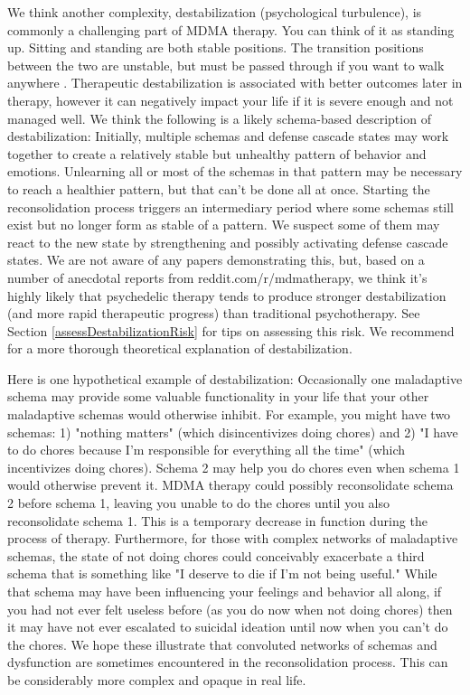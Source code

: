 \documentclass[12pt,letterpaper]{book}
\begin{document}
\label{def:destabilization}
We think another complexity, destabilization (psychological turbulence), is commonly a challenging part of MDMA therapy. You can think of it as standing up. Sitting and standing are both stable positions. The transition positions between the two are unstable, but must be passed through if you want to walk anywhere \cite{olthofDestabilization}. Therapeutic destabilization is associated with better outcomes later in therapy, however it can negatively impact your life if it is severe enough and not managed well. We think the following is a likely schema-based description of destabilization: Initially, multiple schemas and defense cascade states may work together to create a relatively stable but unhealthy pattern of behavior and emotions. Unlearning all or most of the schemas in that pattern may be necessary to reach a healthier pattern, but that can't be done all at once. Starting the reconsolidation process triggers an intermediary period where some schemas still exist but no longer form as stable of a pattern. We suspect some of them may react to the new state by strengthening and possibly activating defense cascade states. We are not aware of any papers demonstrating this, but, based on a number of anecdotal reports from reddit.com/r/mdmatherapy, we think it's highly likely that psychedelic therapy tends to produce stronger destabilization (and more rapid therapeutic progress) than traditional psychotherapy. See Section \ref{assessDestabilizationRisk} for tips on assessing this risk. We recommend \textcite{hayes2020complex} for a more thorough theoretical explanation of destabilization.

Here is one hypothetical example of destabilization: Occasionally one maladaptive schema may provide some valuable functionality in your life that your other maladaptive schemas would otherwise inhibit. For example, you might have two schemas: 1) "nothing matters" (which disincentivizes doing chores) and 2) "I have to do chores because I'm responsible for everything all the time" (which incentivizes doing chores). Schema 2 may help you do chores even when schema 1 would otherwise prevent it. MDMA therapy could possibly reconsolidate schema 2 before schema 1, leaving you unable to do the chores until you also reconsolidate schema 1. This is a temporary decrease in function during the process of therapy. Furthermore, for those with complex networks of maladaptive schemas, the state of not doing chores could conceivably exacerbate a third schema that is something like "I deserve to die if I'm not being useful." While that schema may have been influencing your feelings and behavior all along, if you had not ever felt useless before (as you do now when not doing chores) then it may have not ever escalated to suicidal ideation until now when you can't do the chores. We hope these illustrate that convoluted networks of schemas and dysfunction are sometimes encountered in the reconsolidation process. This can be considerably more complex and opaque in real life.
\end{document}
